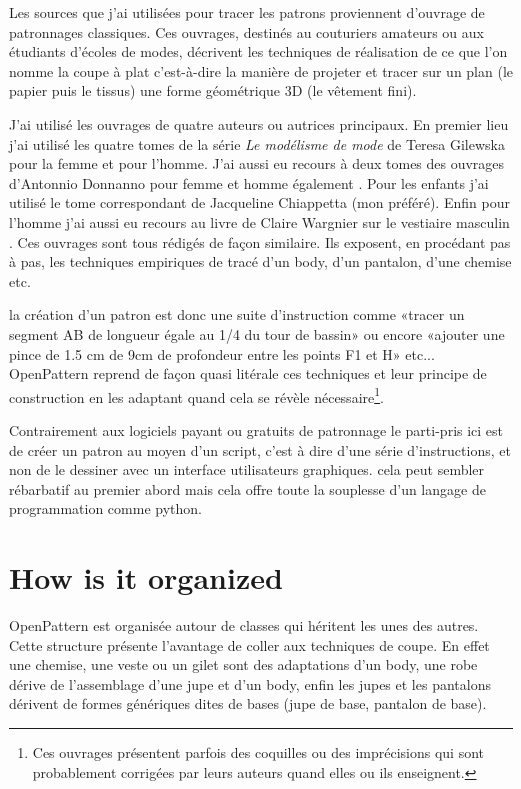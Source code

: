 \documentclass[10pt,a4paper,twoside]{report}
\begin{document}
Les sources que j'ai utilisées pour tracer les patrons proviennent d'ouvrage de patronnages classiques. Ces ouvrages, destinés au couturiers amateurs ou aux étudiants d'écoles de modes, décrivent les techniques de réalisation de ce que l'on nomme la coupe à plat c'est-à-dire  la manière de projeter et tracer sur un plan (le papier puis le tissus) une forme géométrique 3D (le vêtement fini).

J'ai utilisé les ouvrages de quatre auteurs ou autrices principaux.
En premier lieu j'ai utilisé les quatre tomes de la série \textit{Le modélisme de mode} de Teresa Gilewska pour la femme et pour l'homme\cite{Gilewska1,Gilewska2,Gilewska4,Gilewska5}. J'ai aussi eu recours à deux tomes des ouvrages d'Antonnio Donnanno pour femme et homme également \cite{Donnanno2005,Donnanno2016}. Pour les enfants j'ai utilisé le tome correspondant de Jacqueline Chiappetta  \cite{Chiappetta1999} (mon préféré). Enfin pour l'homme j'ai aussi eu recours au livre de  Claire Wargnier sur le vestiaire masculin \cite{wargnier2012}. Ces ouvrages sont tous rédigés de façon similaire. Ils exposent, en procédant pas à pas, les techniques empiriques de tracé d'un body, d'un pantalon, d'une chemise etc.

la création d'un patron est donc une suite d'instruction comme «tracer un segment AB de longueur égale au 1/4 du tour de bassin» ou encore «ajouter une pince de 1.5 cm de 9cm de profondeur entre les points F1 et H» etc...
OpenPattern reprend de façon quasi litérale ces techniques et leur principe de construction en les adaptant quand cela se révèle nécessaire\footnote{Ces ouvrages présentent parfois des coquilles ou des imprécisions qui  sont probablement corrigées par leurs auteurs quand elles ou ils enseignent.}.

Contrairement aux logiciels payant ou gratuits de patronnage le parti-pris ici est de créer  un patron au moyen d'un script, c'est à dire d'une série d'instructions, et non de le dessiner avec un interface utilisateurs graphiques. cela peut sembler rébarbatif au premier abord mais cela offre toute la souplesse d'un langage de programmation comme python.

\section{How is it organized}

OpenPattern est organisée autour de classes qui héritent les unes des autres. Cette structure présente l'avantage de coller aux techniques de coupe. En effet une chemise, une veste ou un gilet sont des adaptations d'un body, une robe dérive de l'assemblage d'une jupe et d'un body, enfin les jupes et les pantalons dérivent de formes génériques dites de bases (jupe de base, pantalon de base).
\end{document}
